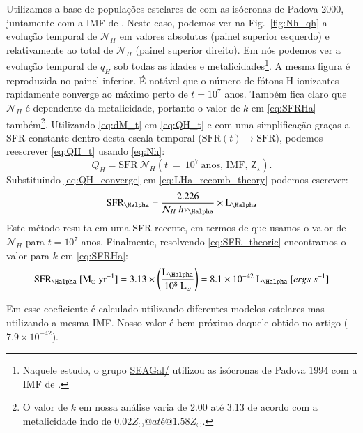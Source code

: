 Utilizamos a base de populações estelares de \citet{BC03a} com as isócronas de Padova 2000,
juntamente com a IMF de \citet{Salpeter.1955a}. Neste caso, podemos ver na Fig.\ \ref{fig:Nh_qh} a
evolução temporal de $\mathcal{N}_H$ em valores absolutos (painel superior esquerdo) e relativamente
ao total de $\mathcal{N}_H$ (painel superior direito). Em \citet[Fig. 2b]{CidFernandes.etal.2011a}
nós podemos ver a evolução temporal de $q_H$ sob todas as idades e metalicidades\footnote{Naquele
estudo, o grupo \href{http://starlight.ufsc.br}{SEAGal/\STARLIGHT} utilizou as isócronas de Padova
1994 com a IMF de \citet{Chabrier.2003a}.}. A mesma figura é reproduzida no painel inferior. É
notável que o número de fótons H-ionizantes rapidamente converge ao máximo perto de $t = 10^7$ anos.
Também fica claro que $\mathcal{N}_H$ é dependente da metalicidade, portanto o valor de $k$ em
\eqref{eq:SFRHa} também\footnote{O valor de $k$ em nossa análise varia de 2.00 até 3.13 de
acordo com a metalicidade indo de $0.02 Z_\odot@ até @1.58 Z_\odot$.}. Utilizando \eqref{eq:dM_t}
em \eqref{eq:QH_t} e com uma simplificação graças a SFR constante dentro desta escala temporal
($\mathrm{SFR}(t)\rightarrow \mathrm{SFR}$), podemos reescrever \eqref{eq:QH_t} usando
\eqref{eq:Nh}:
\begin{equation}
	Q_H = \mathrm{SFR}\ \mathcal{N}_H(t\ =\ 10^7\ \textrm{anos, IMF, Z}{}_\star).
	\label{eq:QH_converge}
\end{equation}
\noindent Substituindo \eqref{eq:QH_converge} em \eqref{eq:LHa_recomb_theory} podemos escrever:
\begin{equation}
	\mathrm{SFR}_{\Halpha} = \frac{2.226}{\mathcal{N}_H\ h \nu_{\Halpha}} \times \LHalpha
	\label{eq:SFR_theoric}
\end{equation}
\noindent Este método resulta em uma SFR recente, em termos de que usamos o valor de $\mathcal{N}_H$
para $t = 10^7$ anos. Finalmente, resolvendo \eqref{eq:SFR_theoric} encontramos o valor para $k$ em
\eqref{eq:SFRHa}:
\begin{equation}
	\mathrm{SFR}_{\Halpha}\ [\mathrm{M}_\odot\ \mathrm{yr}^{-1}] = 3.13 \times
	\left(\frac{\LHalpha}{10^8\ \mathrm{L}_\odot}\right) = 8.1 \times 10^{-42}\ \LHalpha\ [ergs\ s^{-1}]
	\label{eq:SFRNeb}
\end{equation}

Em \citet{Kennicutt.1998a} esse coeficiente é calculado utilizando diferentes modelos estelares mas
utilizando a mesma IMF. Nosso valor é bem próximo daquele obtido no artigo ($7.9 \times 10^{-42}$).

